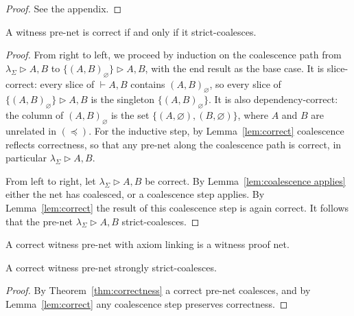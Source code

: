 \documentclass[UKenglish]{lipics-v2016}
\theoremstyle{plain}
\newcommand\+{+}
\renewcommand\*{\times}
\newcommand\dep{\preccurlyeq}
\newcommand\seq[2]{{\vdash}#1,#2}
\newcommand\net[3]{#1\triangleright #2,#3}
\newcommand\link[3][\sigma]{(#2,#3)_{#1}}
\begin{document}
\begin{proof}
See the appendix.
\end{proof}


\begin{theorem}
\label{thm:correctness}
A witness pre-net is correct if and only if it strict-coalesces. 
\end{theorem}

\begin{proof}
From right to left, we proceed by induction on the coalescence path from $\net{\lambda_\Sigma}AB$ to $\net{\{\link[\varnothing]AB\}}AB$, with the end result as the base case. It is slice-correct: every slice of $\seq AB$ contains $\link[\varnothing]AB$, so every slice of $\net{\{\link[\varnothing]AB\}}AB$ is the singleton $\{\link[\varnothing]AB\}$. It is also dependency-correct: the column of $\link[\varnothing]AB$ is the set $\{(A,\varnothing),(B,\varnothing)\}$, where $A$ and $B$ are unrelated in $(\dep)$. For the inductive step, by Lemma~\ref{lem:correct} coalescence reflects correctness, so that any pre-net along the coalescence path is correct, in particular $\net{\lambda_\Sigma}AB$.

From left to right, let $\net{\lambda_\Sigma}AB$ be correct. By Lemma~\ref{lem:coalescence applies} either the net has coalesced, or a coalescence step applies. By Lemma~\ref{lem:correct} the result of this coalescence step is again correct. It follows that the pre-net $\net{\lambda_\Sigma}AB$ strict-coalesces.
\end{proof}


\begin{corollary}
A correct witness pre-net with axiom linking is a witness proof net.
\end{corollary}


\begin{corollary}
\label{cor:strong coalescence}
A correct witness pre-net strongly strict-coalesces.
\end{corollary}

\begin{proof}
By Theorem~\ref{thm:correctness} a correct pre-net coalesces, and by Lemma~\ref{lem:correct} any coalescence step preserves correctness.
\end{proof}
\end{document}
